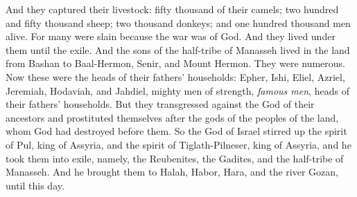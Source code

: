 \begin{biblechapter}
\verse And they captured their livestock: fifty thousand of their camels; two hundred and fifty thousand sheep; two thousand donkeys; and one hundred thousand men alive.
\verse For many were slain because the war was of God. And they lived under them until the exile.
 And the sons of the half-tribe of Manasseh lived in the land from Bashan to Baal-Hermon, Senir, and Mount Hermon. They were numerous.
\verse Now these were the heads of their fathers’ households: Epher, Ishi, Eliel, Azriel, Jeremiah, Hodaviah, and Jahdiel, mighty men of strength, \textit{famous men}, heads of their fathers’ households.
\verse But they transgressed against the God of their ancestors and prostituted themselves after the gods of the peoples of the land, whom God had destroyed before them.
\verse So the God of Israel stirred up the spirit of Pul, king of Assyria, and the spirit of Tiglath-Pilneser, king of Assyria, and he took them into exile, namely, the Reubenites, the Gadites, and the half-tribe of Manasseh. And he brought them to Halah, Habor, Hara, and the river Gozan, until this day.
\end{biblechapter}

